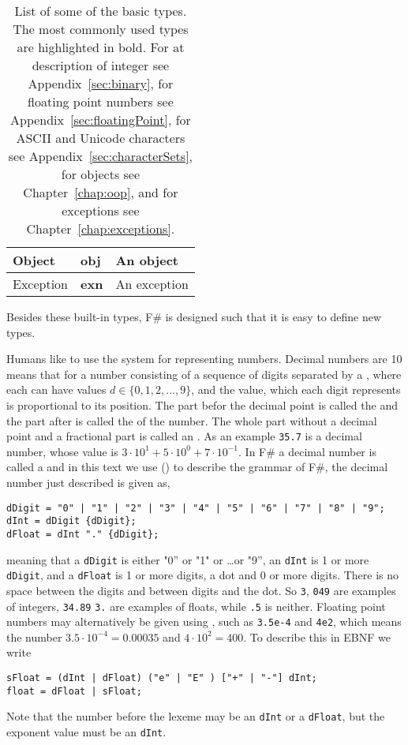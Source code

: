 \begin{table}
\begin{tabularx}{\textwidth}{|l|l|>{\raggedright\arraybackslash}X|}
    \hline
    Object &\textbf{obj} & An object\\
    \hline
    Exception &\textbf{exn} & An exception\\
    \hline
  \end{tabularx}
  \caption{List of some of the basic types. The most commonly used types are highlighted in bold. For at description of integer see Appendix~\ref{sec:binary}, for floating point numbers see Appendix~\ref{sec:floatingPoint}, for ASCII and Unicode characters see Appendix~\ref{sec:characterSets}, for objects see Chapter~\ref{chap:oop}, and for exceptions see Chapter~\ref{chap:exceptions}.}
  \label{tab:primitiveTypes}
\end{table}
Besides these built-in types, F\# is designed such that it is easy to define new types. 

Humans like to use the  system for representing numbers. Decimal numbers are  10 means that for a number consisting of a sequence of digits separated by a , where each  can have values $d \in \{0,1,2,\ldots,9\}$, and the value, which each digit represents is proportional to its position. The part befor the decimal point is called the  and the part after is called the  of the number. The whole part without a decimal point and a fractional part is called an . As an example \lstinline!35.7! is a decimal number, whose value is $3\cdot 10^1+5\cdot 10^0+7\cdot 10^{-1}$. In F\# a decimal number is called a  and in this text we use  () to describe the grammar of F\#, the decimal number just described is given as,
%
\begin{lstlisting}[language=ebnf]
dDigit = "0" | "1" | "2" | "3" | "4" | "5" | "6" | "7" | "8" | "9";
dInt = dDigit {dDigit};
dFloat = dInt "." {dDigit};
\end{lstlisting}
%
meaning that a \lstinline[language=ebnf]!dDigit! is either "0'' or "1" or \dots or "9'', an \lstinline[language=ebnf]!dInt! is 1 or more \lstinline[language=ebnf]!dDigit!, and a \lstinline[language=ebnf]!dFloat! is 1 or more digits, a dot and 0 or more digits. There is no space between the digits and between digits and the dot. So \lstinline!3!, \lstinline!049! are examples of integers, \lstinline!34.89! \lstinline!3.! are examples of floats, while \lstinline!.5! is neither.  Floating point numbers may alternatively be given using , such as \lstinline!3.5e-4! and \lstinline!4e2!, which means the number $3.5\cdot 10^{-4} = 0.00035$ and $4\cdot 10^2=400$. To describe this in EBNF we write
%
\begin{lstlisting}[language=ebnf]
sFloat = (dInt | dFloat) ("e" | "E" ) ["+" | "-"] dInt;
float = dFloat | sFloat;
\end{lstlisting}
%
Note that the number before the lexeme  may be an \lstinline[language=ebnf]!dInt! or a \lstinline[language=ebnf]!dFloat!, but the exponent value must be an \lstinline[language=ebnf]!dInt!.


